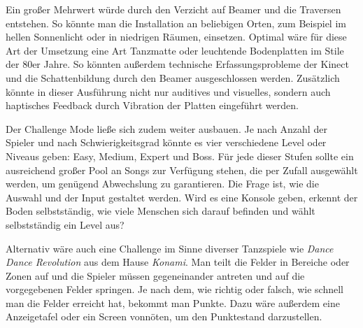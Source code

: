 
Ein großer Mehrwert würde durch den Verzicht auf Beamer und die Traversen entstehen. So könnte man die Installation an beliebigen Orten, zum Beispiel im hellen Sonnenlicht oder in niedrigen Räumen, einsetzen. Optimal wäre für diese Art der Umsetzung eine Art Tanzmatte oder leuchtende Bodenplatten im Stile der 80er Jahre. So könnten außerdem technische Erfassungsprobleme der Kinect und die Schattenbildung durch den Beamer ausgeschlossen werden. Zusätzlich könnte in dieser Ausführung nicht nur auditives und visuelles, sondern auch haptisches Feedback durch Vibration der Platten eingeführt werden.

Der Challenge Mode ließe sich zudem weiter ausbauen. Je nach Anzahl der Spieler und nach Schwierigkeitsgrad könnte es vier verschiedene Level oder Niveaus geben: Easy, Medium, Expert und Boss. Für jede dieser Stufen sollte ein ausreichend großer Pool an Songs zur Verfügung stehen, die per Zufall ausgewählt werden, um genügend Abwechslung zu garantieren. Die Frage ist, wie die Auswahl und der Input gestaltet werden. Wird es eine Konsole geben, erkennt der Boden selbstständig, wie viele Menschen sich darauf befinden und wählt selbstständig ein Level aus?

Alternativ wäre auch eine Challenge im Sinne diverser Tanzspiele wie \emph{Dance Dance Revolution} aus dem Hause \emph{Konami}. Man teilt die Felder in Bereiche oder Zonen auf und die Spieler müssen gegeneinander antreten und auf die vorgegebenen Felder springen. Je nach dem, wie richtig oder falsch, wie schnell man die Felder erreicht hat, bekommt man Punkte. Dazu wäre außerdem eine Anzeigetafel oder ein Screen vonnöten, um den Punktestand darzustellen.